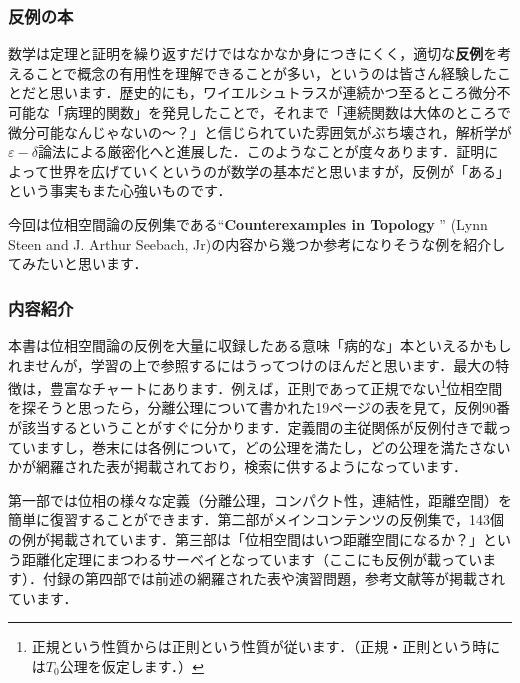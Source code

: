 \subsubsection*{反例の本}
数学は定理と証明を繰り返すだけではなかなか身につきにくく，適切な{\bf 反例}を考えることで概念の有用性を理解できることが多い，というのは皆さん経験したことだと思います．歴史的にも，ワイエルシュトラスが連続かつ至るところ微分不可能な「病理的関数」を発見したことで，それまで「連続関数は大体のところで微分可能なんじゃないの〜？」と信じられていた雰囲気がぶち壊され，解析学が$\varepsilon - \delta$論法による厳密化へと進展した．このようなことが度々あります．証明によって世界を広げていくというのが数学の基本だと思いますが，反例が「ある」という事実もまた心強いものです．\par
今回は位相空間論の反例集である“{\bf Counterexamples in Topology }”  (Lynn Steen and J. Arthur Seebach, Jr)の内容から幾つか参考になりそうな例を紹介してみたいと思います．
\subsubsection*{内容紹介}
本書は位相空間論の反例を大量に収録したある意味「病的な」本といえるかもしれませんが，学習の上で参照するにはうってつけのほんだと思います．最大の特徴は，豊富なチャートにあります．例えば，正則であって正規でない\footnote{正規という性質からは正則という性質が従います．（正規・正則という時には$T_0$公理を仮定します．）}位相空間を探そうと思ったら，分離公理について書かれた19ページの表を見て，反例90番が該当するということがすぐに分かります．定義間の主従関係が反例付きで載っていますし，巻末には各例について，どの公理を満たし，どの公理を満たさないかが網羅された表が掲載されており，検索に供するようになっています．\par
第一部では位相の様々な定義（分離公理，コンパクト性，連結性，距離空間）を簡単に復習することができます．第二部がメインコンテンツの反例集で，143個の例が掲載されています．第三部は「位相空間はいつ距離空間になるか？」という距離化定理にまつわるサーベイとなっています（ここにも反例が載っています）．付録の第四部では前述の網羅された表や演習問題，参考文献等が掲載されています．

